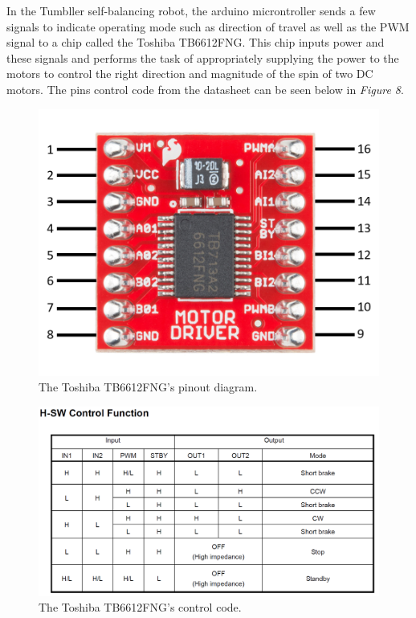 \documentclass[12pt]{article}
\begin{document}
In the Tumbller self-balancing robot, the arduino microntroller sends a few signals to indicate operating mode such as direction of travel as well as the PWM signal to a chip called the Toshiba TB6612FNG. This chip inputs power and these signals and performs the task of appropriately supplying the power to the motors to control the right direction and magnitude of the spin of two DC motors. The pins control code from the datasheet can be seen below in \textit{Figure 8}.

\begin{figure}[H]
    \centering
    \includegraphics[width=12cm]{photos/lab/motordriver.png}
    \caption{The Toshiba TB6612FNG's pinout diagram.}
\end{figure}

\begin{figure}[H]
    \centering
    \includegraphics[width=12cm]{photos/prelim/motorcontrol.PNG}
    \caption{The Toshiba TB6612FNG's control code.}
\end{figure}
\end{document}

